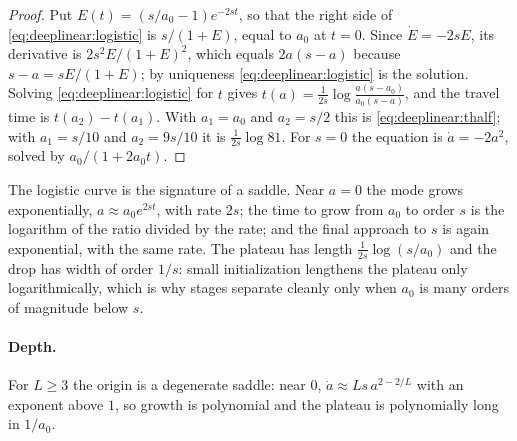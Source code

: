 \begin{refsection}

\begin{proof}
Put $E(t)=(s/a_0-1)e^{-2st}$, so that the right side of \eqref{eq:deeplinear:logistic} is $s/(1+E)$, equal to $a_0$ at $t=0$. Since $\dot E=-2sE$, its derivative is $2s^2E/(1+E)^2$, which equals $2a(s-a)$ because $s-a=sE/(1+E)$; by uniqueness \eqref{eq:deeplinear:logistic} is the solution. Solving \eqref{eq:deeplinear:logistic} for $t$ gives $t(a)=\frac1{2s}\log\frac{a(s-a_0)}{a_0(s-a)}$, and the travel time is $t(a_2)-t(a_1)$. With $a_1=a_0$ and $a_2=s/2$ this is \eqref{eq:deeplinear:thalf}; with $a_1=s/10$ and $a_2=9s/10$ it is $\frac1{2s}\log81$. For $s=0$ the equation is $\dot a=-2a^2$, solved by $a_0/(1+2a_0t)$.
\end{proof}

The logistic curve is the signature of a saddle. Near $a=0$ the mode grows exponentially, $a\approx a_0e^{2st}$, with rate $2s$; the time to grow from $a_0$ to order $s$ is the logarithm of the ratio divided by the rate; and the final approach to $s$ is again exponential, with the same rate. The plateau has length $\frac1{2s}\log(s/a_0)$ and the drop has width of order $1/s$: small initialization lengthens the plateau only logarithmically, which is why stages separate cleanly only when $a_0$ is many orders of magnitude below $s$.

\paragraph{Depth.} For $L\ge3$ the origin is a degenerate saddle: near $0$, $\dot a\approx Ls\,a^{2-2/L}$ with an exponent above $1$, so growth is polynomial and the plateau is polynomially long in $1/a_0$.


\end{refsection}
